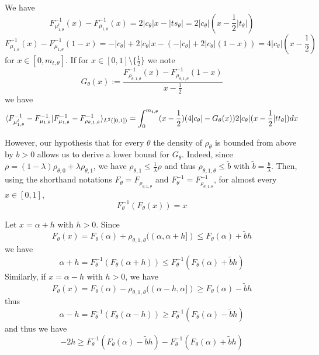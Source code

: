     We have 
    \begin{equation} F^{-1}_{\mu^t_{1,\theta}}(x) - F^{-1}_{\mu_{1,\theta}}(x) = 2|c_\theta|x - |ts_\theta| = 2|c_\theta|(x - \frac{1}{2}|t_\theta|)\end{equation}
    \begin{equation} F^{-1}_{\mu_{1,\theta}}(x) - F^{-1}_{\mu_{1,\theta}}(1-x) = -|c_\theta| + 2|c_\theta|x - (-|c_\theta| + 2|c_\theta|(1-x)) = 4|c_\theta|(x - \frac{1}{2}) \end{equation}
    for $x \in [0, m_{t,\theta}]$. If for $x \in [0,1] \setminus \{\frac{1}{2}\}$ we note 
    \begin{equation} G_\theta(x) := \frac{F^{-1}_{\rho_{\theta,1,\theta}}(x) - F^{-1}_{\rho_{\theta,1,\theta}}(1-x)}{x - \frac{1}{2}}\end{equation} we have
    \begin{equation} \langle F^{-1}_{\mu^t_{1,\theta}} - F^{-1}_{\mu_{1,\theta}}|F^{-1}_{\mu_{1,\theta}} - F^{-1}_{\rho_{\theta,1,\theta}}\rangle_{L^2([0,1])} = \int_0^{m_{t,\theta}} (x - \frac{1}{2})(4|c_\theta| - G_\theta(x))2|c_\theta|(x - \frac{1}{2}|tt_\theta|) dx \end{equation}
        
    However, our hypothesis that for every $\theta$ the density of $\rho_\theta$ is bounded from above by $b > 0$ allows us to derive a lower bound for $G_\theta$. Indeed, since $\rho = (1-\lambda)\rho_{\theta,0} + \lambda \rho_{\theta,1}$, we have $\rho_{\theta,1} \leq \frac{1}{\lambda} \rho$ and thus $\rho_{\theta,1,\theta} \leq \tilde{b}$ with $\tilde{b} = \frac{b}{\lambda}$. Then, using the shorthand notations $F_\theta = F_{\rho_{\theta,1,\theta}}$ and $F^{-1}_\theta = F^{-1}_{\rho_{\theta,1,\theta}}$, for almost every $x \in [0,1]$,
    \begin{equation} F^{-1}_\theta(F_\theta(x)) = x\end{equation}
    
    Let $x = \alpha + h$ with $h > 0$. Since 
    \begin{equation}F_\theta(x) = F_\theta(\alpha) + \rho_{\theta,1,\theta}((\alpha,\alpha+h]) \leq F_\theta(\alpha) + \tilde{b}h \end{equation}
    we have
    \begin{equation} \alpha + h = F^{-1}_\theta(F_\theta(\alpha + h)) \leq F^{-1}_\theta(F_\theta(\alpha) + \tilde{b}h)\end{equation}
    Similarly, if $x = \alpha - h$ with $h > 0$, we have
    \begin{equation}F_\theta(x) = F_\theta(\alpha) - \rho_{\theta,1,\theta}((\alpha-h,\alpha]) \geq F_\theta(\alpha) - \tilde{b}h \end{equation}
    thus
    \begin{equation} \alpha - h = F^{-1}_\theta(F_\theta(\alpha - h)) \geq F^{-1}_\theta(F_\theta(\alpha) - \tilde{b}h)\end{equation}
    and thus we have
    \begin{equation} -2h \geq F^{-1}_\theta(F_\theta(\alpha) - \tilde{b}h) - F^{-1}_\theta(F_\theta(\alpha) + \tilde{b}h)\end{equation}
    
